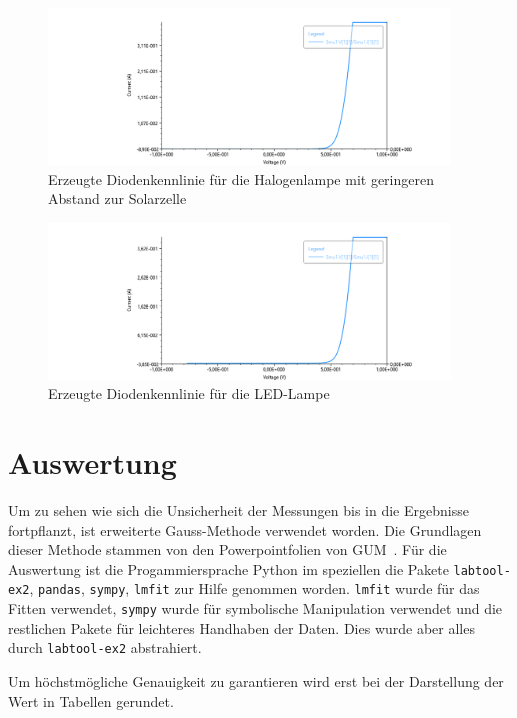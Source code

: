 \documentclass[12pt,english,ngerman]{scrartcl}
\begin{document}
\begin{figure}[H]
	\centering
	\includegraphics[width=0.95\textwidth]{figures/helllampe2.png}
	\caption{Erzeugte Diodenkennlinie für die Halogenlampe mit geringeren Abstand zur Solarzelle
	}\label{fig:mess_hellkennlinie_lampe2}
\end{figure}

\begin{figure}[H]
	\centering
	\includegraphics[width=0.95\textwidth]{figures/hellled.png}
	\caption{Erzeugte Diodenkennlinie für die LED-Lampe
	}\label{fig:mess_hellkennlinie_led}
\end{figure}

\section{Auswertung}\label{sec:auswertung}

Um zu sehen wie sich die Unsicherheit der Messungen bis in die Ergebnisse
fortpflanzt, ist erweiterte Gauss-Methode verwendet worden. Die Grundlagen
dieser Methode stammen von den Powerpointfolien von
GUM~\cite{wolfgang_kessel_isobipm-gum_2004}. Für die Auswertung ist die
Progammiersprache Python im speziellen die Pakete \verb#labtool-ex2#,
\verb#pandas#, \verb#sympy#, \verb#lmfit# zur Hilfe genommen worden.
\verb#lmfit# wurde für das Fitten verwendet, \verb#sympy# wurde für symbolische
Manipulation verwendet und die restlichen Pakete für leichteres Handhaben der
Daten. Dies wurde aber alles durch \verb#labtool-ex2# abstrahiert.

Um höchstmögliche Genauigkeit zu garantieren wird erst bei der Darstellung der
Wert in Tabellen gerundet.
\end{document}
